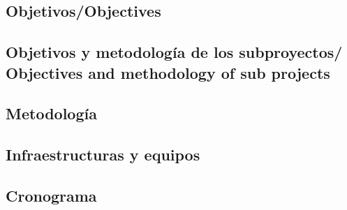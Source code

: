 \documentclass[a4paper,11pt,oneside]{article}
\begin{document}


\subsection*{\sc Objetivos/Objectives}




\subsection*{\sc Objetivos y metodología de los subproyectos/ Objectives and methodology of sub projects}

%




%
%
%
%
%

%
%

\subsection*{\sc Metodología}

%

\subsection*{\sc Infraestructuras y equipos}

%

\subsection*{\sc Cronograma}
\end{document}
